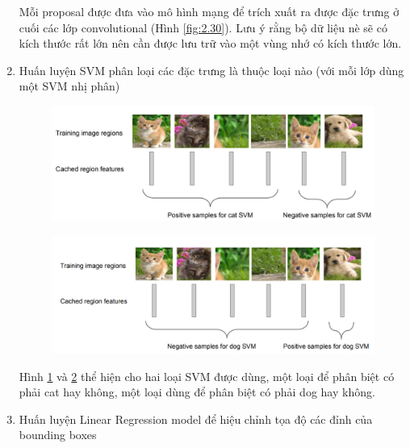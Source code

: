 \begin{enumerate}
	Mỗi proposal được đưa vào mô hình mạng để trích xuất ra được đặc trưng ở cuối các lớp convolutional (Hình \ref{fig:2.30}). Lưu ý rằng bộ dữ liệu nè sẽ có kích thước rất lớn nên cần được lưu trữ vào một vùng nhớ có kích thước lớn.
    \item Huấn luyện SVM phân loại các đặc trưng là thuộc loại nào (với mỗi lớp dùng một SVM nhị phân)
    \begin{center}
    	\begin{figure}[H]
	    \centering
	    \includegraphics[width=0.8\columnwidth]{images/chap2/rcnn_4_1.png}
	    \label{fig:2.31}
	    \end{figure}
	\end{center}
    \begin{center}
    	\begin{figure}[H]
	    \centering
	    \includegraphics[width=0.8\columnwidth]{images/chap2/rcnn_4.png}
	    \label{fig:2.32}
	    \end{figure}
	\end{center}
	Hình \ref{fig:2.31} và \ref{fig:2.32} thể hiện cho hai loại SVM được dùng, một loại để phân biệt có phải cat hay không, một loại dùng để phân biệt có phải dog hay không.
    \item Huấn luyện Linear Regression model để hiệu chỉnh tọa độ các đỉnh của bounding boxes
    \begin{center}
    	\begin{figure}[H]

\end{figure}
\end{center}
\end{enumerate}
